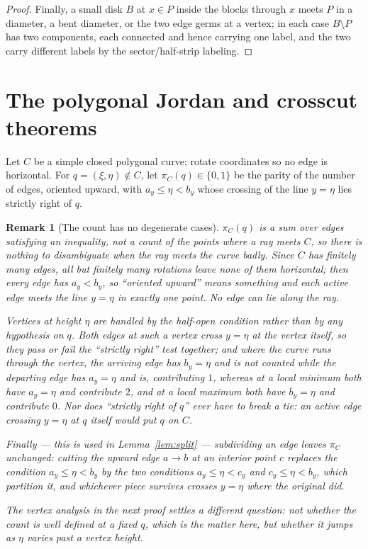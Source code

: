 \documentclass[11pt,a4paper]{article}
\theoremstyle{jsplain}
\theoremstyle{jsdefn}
\newtheorem{remark}[theorem]{Remark}
\begin{document}
\begin{proof}
Finally, a small disk $B$ at $x\in P$ inside the blocks through $x$
meets $P$ in a diameter, a bent diameter, or the two edge germs at a
vertex; in each case $B\setminus P$ has two components, each connected
and hence carrying one label, and the two carry different labels by
the sector/half-strip labeling.
\end{proof}

\section{The polygonal Jordan and crosscut theorems}\label{sec:polygonal}

Let $C$ be a simple closed polygonal curve; rotate coordinates so no
edge is horizontal. For $q=(\xi,\eta)\notin C$, let $\pi_C(q)\in\{0,1\}$
be the parity of the number of edges, oriented upward, with
$a_y\le\eta<b_y$ whose crossing of the line $y=\eta$ lies strictly
right of $q$.


\begin{remark}[The count has no degenerate cases]\label{rem:parity}
$\pi_C(q)$ is a sum over \emph{edges} satisfying an inequality, not a
count of the points where a ray meets $C$, so there is nothing to
disambiguate when the ray meets the curve badly. Since $C$ has finitely
many edges, all but finitely many rotations leave none of them
horizontal; then every edge has $a_y<b_y$, so ``oriented upward'' means
something and each active edge meets the line $y=\eta$ in exactly one
point. No edge can lie \emph{along} the ray.

Vertices at height $\eta$ are handled by the half-open condition rather
than by any hypothesis on $q$. Both edges at such a vertex cross
$y=\eta$ at the vertex itself, so they pass or fail the ``strictly
right'' test together; and where the curve runs through the vertex, the
arriving edge has $b_y=\eta$ and is not counted while the departing edge
has $a_y=\eta$ and is, contributing $1$, whereas at a local minimum both
have $a_y=\eta$ and contribute $2$, and at a local maximum both have
$b_y=\eta$ and contribute $0$. Nor does ``strictly right of $q$'' ever
have to break a tie: an active edge crossing $y=\eta$ at $q$ itself
would put $q$ on $C$.

Finally --- this is used in Lemma~\ref{lem:split} --- subdividing an
edge leaves $\pi_C$ unchanged: cutting the upward edge $a\to b$ at an
interior point $c$ replaces the condition $a_y\le\eta<b_y$ by the two
conditions $a_y\le\eta<c_y$ and $c_y\le\eta<b_y$, which partition it,
and whichever piece survives crosses $y=\eta$ where the original did.

The vertex analysis in the next proof settles a different question: not
whether the count is well defined at a fixed $q$, which is the matter
here, but whether it jumps as $\eta$ \emph{varies past} a vertex height.
\end{remark}
\end{document}

